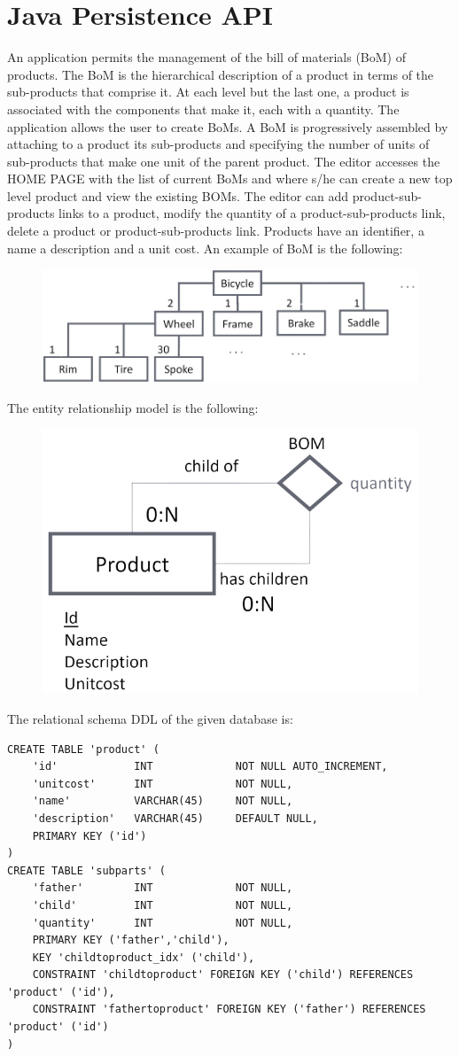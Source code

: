\documentclass[12pt, a4paper]{report}
\begin{document}
    \section{Java Persistence API}
        An application permits the management of the bill of materials (BoM) of products. The BoM is the hierarchical description of a product in terms of the 
        sub-products that comprise it. At each level but the last one, a product is associated with the components that make it, each with a quantity. The application 
        allows the user to create BoMs. A BoM is progressively assembled by attaching to a product its sub-products and specifying the number of units of sub-products 
        that make one unit of the parent product. The editor accesses the HOME PAGE with the list of current BoMs and where s/he can create a new top level product and 
        view the existing BOMs. The editor can add product-sub-products links to a product, modify the quantity of a product-sub-products link, delete a product or
        product-sub-products link. Products have an identifier, a name a description and a unit cost. An example of BoM is the following: 
        \begin{figure}[H]
            \centering
            \includegraphics[width=0.6\linewidth]{images/BoM.png}
        \end{figure}
        The entity relationship model is the following:
        \begin{figure}[H]
            \centering
            \includegraphics[width=0.3\linewidth]{images/e-r1.png}
        \end{figure}
        The relational schema DDL of the given database is: 
        \begin{lstlisting}[style=SQL]
CREATE TABLE 'product' (
    'id'            INT             NOT NULL AUTO_INCREMENT,
    'unitcost'      INT             NOT NULL,
    'name'          VARCHAR(45)     NOT NULL,
    'description'   VARCHAR(45)     DEFAULT NULL,
    PRIMARY KEY ('id')
) 
CREATE TABLE 'subparts' (
    'father'        INT             NOT NULL,
    'child'         INT             NOT NULL,
    'quantity'      INT             NOT NULL,
    PRIMARY KEY ('father','child'),
    KEY 'childtoproduct_idx' ('child'),
    CONSTRAINT 'childtoproduct' FOREIGN KEY ('child') REFERENCES 'product' ('id'),
    CONSTRAINT 'fathertoproduct' FOREIGN KEY ('father') REFERENCES 'product' ('id')
)           
        \end{lstlisting}
\end{document}
